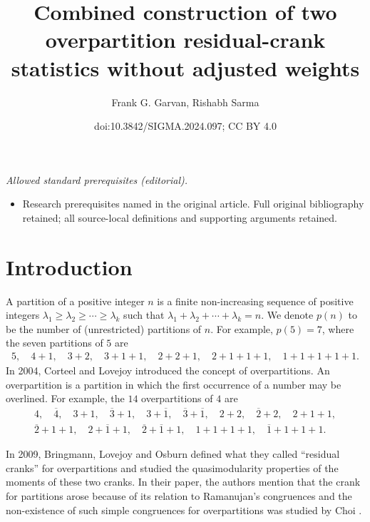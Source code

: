 \documentclass[10pt,a4paper]{amsart}
\title{Combined construction of two overpartition residual-crank statistics without adjusted weights}
\author{Frank G. Garvan, Rishabh Sarma}
\date{doi:10.3842/SIGMA.2024.097; CC BY 4.0}
\numberwithin{equation}{section}
\begin{document}
\maketitle
\noindent\textit{Allowed standard prerequisites (editorial).}\begin{itemize}
\item Research prerequisites named in the original article. Full original bibliography retained; all source-local definitions and supporting arguments retained.
\end{itemize}\medskip
\section{Introduction}\label{section1}

A partition of a positive integer $n$ is a finite non-increasing sequence of positive integers $\lambda_1 \geq \lambda_2 \geq \cdots \geq \lambda_k$ such that $\lambda_1 + \lambda_2 + \cdots + \lambda_k = n$. We denote $p(n)$ to be the number of (unrestricted) partitions of $n$. For example, $p(5) = 7$, where the seven partitions of $5$ are
\begin{align*}
5,\quad 4+1,\quad 3+2,\quad 3+1+1,\quad 2+2+1,\quad 2+1+1+1,\quad 1+1+1+1+1.
\end{align*}
In 2004, Corteel and Lovejoy \cite{Co-Lo} introduced the concept of overpartitions. An overpartition is a partition in which the first occurrence of a number may be overlined.
For example, the $14$ overpartitions of $4$ are
\begin{gather*}
4,\quad  \overline{4},\quad  3 + 1,\quad  \overline{3} + 1,\quad  3 + \overline{1},\quad  \overline{3} + \overline{1},\quad  2 + 2,\quad  \overline{2} + 2,\quad  2 + 1 + 1,
\\
\overline{2} + 1 + 1,\quad  2 + \overline{1} + 1,\quad  \overline{2} + \overline{1} + 1,\quad 1 + 1 + 1 + 1,\quad  \overline{1} + 1 + 1 + 1.
\end{gather*}

In 2009, Bringmann, Lovejoy and Osburn \cite{Br-Lo-Os} defined what they called ``residual cranks'' for overpartitions and studied the quasimodularity properties of the moments of these two cranks. In their paper, the authors mention that the crank for partitions arose because of its relation to Ramanujan's congruences and the non-existence of such simple congruences for overpartitions was studied by Choi \cite{Ch09}.
\end{document}
